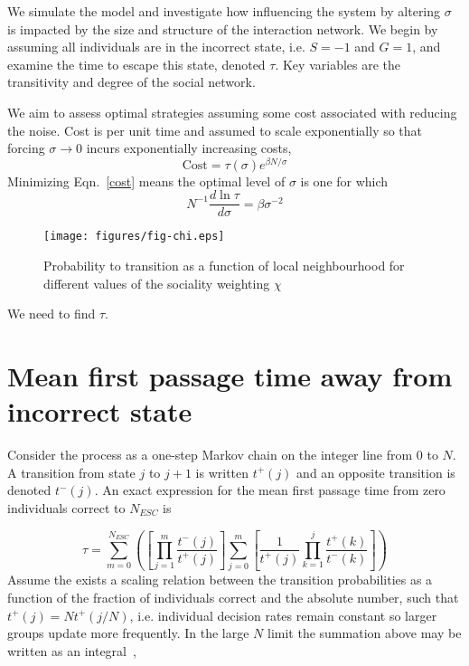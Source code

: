 \documentclass[3p,number,sort&compress,times]{elsarticle}
\begin{document}
We simulate the model and investigate how influencing the system by altering $\sigma$ is impacted by the size and structure of the interaction network. We begin by assuming all individuals are in the incorrect state, i.e. $S=-1$ and $G=1$, and examine the time to escape this state, denoted $\tau$. Key variables are the transitivity and degree of the social network.

We aim to assess optimal strategies assuming some cost associated with reducing the noise. Cost is per unit time and assumed to scale exponentially so that forcing $\sigma \rightarrow 0$ incurs exponentially increasing costs,
\begin{equation}
\mbox{Cost} = \tau (\sigma) e^{\beta N/\sigma}
\label{cost}
\end{equation}
Minimizing Eqn.~\ref{cost} means the optimal level of $\sigma$ is one for which
\begin{equation}
N^{-1} \frac{d \ln \tau}{d \sigma} = \beta \sigma^{-2}
\end{equation}
\begin{figure*}
\centering
\texttt{[image: figures/fig-chi.eps]} 
\caption{Probability to transition as a function of local neighbourhood for different values of the sociality weighting $\chi$}
\label{fig1}
\end{figure*}
We need to find $\tau$.
\section{Mean first passage time away from incorrect state}
Consider the process as a one-step Markov chain on the integer line from $0$ to $N$. A transition from state $j$ to $j+1$ is written $t^+(j)$ and an opposite transition is denoted $t^-(j)$. An exact expression for the mean first passage time from zero individuals correct to $N_{ESC}$ is \cite{gardiner}

\begin{equation}
\tau = \sum\limits_{m=0}^{N_{ESC}} \left( \left[ \prod\limits_{j=1}^{m} \frac{t^-(j)}{t^+(j)} \right] \sum\limits_{j=0}^{m} \left[\frac{1}{t^+(j)} \prod\limits_{k=1}^{j} \frac{t^+(k)}{t^-(k)}  \right]   \right)
\label{noapprox1}
\end{equation}
Assume the exists a scaling relation between the transition probabilities as a function of the fraction of individuals correct and the absolute number, such that $t^+(j) = N t^+(j/N)$, i.e. individual decision rates remain constant so larger groups update more frequently. In the large $N$ limit the summation above may be written as an integral~\cite{doering}, 
\end{document}
